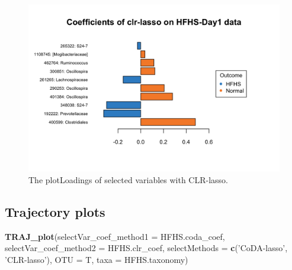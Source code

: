 \documentclass[openany]{book}
\newenvironment{Shaded}{\begin{snugshade}}{\end{snugshade}}
\newcommand{\KeywordTok}[1]{\textcolor[rgb]{0.13,0.29,0.53}{\textbf{#1}}}
\newcommand{\DataTypeTok}[1]{\textcolor[rgb]{0.13,0.29,0.53}{#1}}
\newcommand{\StringTok}[1]{\textcolor[rgb]{0.31,0.60,0.02}{#1}}
\newcommand{\NormalTok}[1]{#1}
\begin{document}
\begin{figure}

{\centering \includegraphics[width=1\linewidth]{./Generated_plots/loadclrHFHS-1} 

}

\caption{The plotLoadings of selected variables with CLR-lasso.}\label{fig:loadclrHFHS}
\end{figure}

\subsection{Trajectory plots}\label{trajectory-plots-1}

\begin{Shaded}
\begin{Highlighting}[]
\KeywordTok{TRAJ_plot}\NormalTok{(}\DataTypeTok{selectVar_coef_method1 =}\NormalTok{ HFHS.coda_coef, }\DataTypeTok{selectVar_coef_method2 =}\NormalTok{ HFHS.clr_coef, }
          \DataTypeTok{selectMethods =} \KeywordTok{c}\NormalTok{(}\StringTok{'CoDA-lasso'}\NormalTok{, }\StringTok{'CLR-lasso'}\NormalTok{), }\DataTypeTok{OTU =}\NormalTok{ T, }\DataTypeTok{taxa =}\NormalTok{ HFHS.taxonomy)}
\end{Highlighting}
\end{Shaded}
\end{document}
